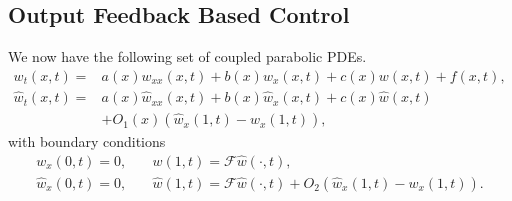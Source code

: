 \documentclass[US letter, 9 pt, conference]{ieeeconf}  \usepackage{setspace}
\newcommand{\wh}{\hat{w}}
\newcommand{\mcl}[1]{\mathcal{#1}}
\begin{document}
\subsection{Output Feedback Based Control}
We now have the following set of coupled parabolic PDEs.
\begin{align}
w_t(x,t)=&\label{eqn:couple1}a(x)w_{xx}(x,t)+b(x)w_x(x,t)+c(x)w(x,t)+f(x,t),\\
\wh_t(x,t)=&a(x)\wh_{xx}(x,t)+b(x)\wh_x(x,t)+c(x)\wh(x,t) \nonumber \\
&\label{eqn:couple2}+O_1(x) \left(\wh_x(1,t)-w_x(1,t) \right),
\end{align}
with boundary conditions
\begin{align}
w_x(0,t)=0, \quad &\label{eqn:couple3}w(1,t)=\mcl{F}\wh(\cdot,t),\\
\wh_x(0,t)=0, \quad &\label{eqn:couple4}\wh(1,t)=\mcl{F}\wh(\cdot,t)+O_2\left(\wh_x(1,t)-w_x(1,t) \right).
\end{align}
\end{document}
